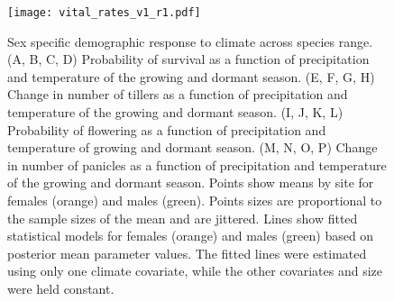 \documentclass[9pt,twocolumn,twoside,lineno]{pnas-new}
\begin{document}
\begin{figure}[H]
\centering
\texttt{[image: vital\_rates\_v1\_r1.pdf]}
\caption{Sex specific demographic response to climate across species range.
			(A, B, C, D) Probability of survival as a function of precipitation and temperature of the growing and dormant season.
			(E, F, G, H) Change in number of tillers as a function of precipitation and temperature of the growing and dormant season.
			(I, J, K, L) Probability of flowering as a function of precipitation and temperature of growing and dormant season.
			(M, N, O, P) Change in number of panicles as a function of precipitation and temperature of the growing and dormant season.
			Points show means by site for females (orange) and males (green). 
			Points sizes are proportional to the sample sizes of the mean and are jittered.
			Lines show fitted statistical models for females (orange) and males (green) based on posterior mean parameter values.
			The fitted lines were estimated using only one climate covariate, while the other covariates and size were held constant.
			}
\label{fig:vital_rates}
\end{figure}
\clearpage
\end{document}
